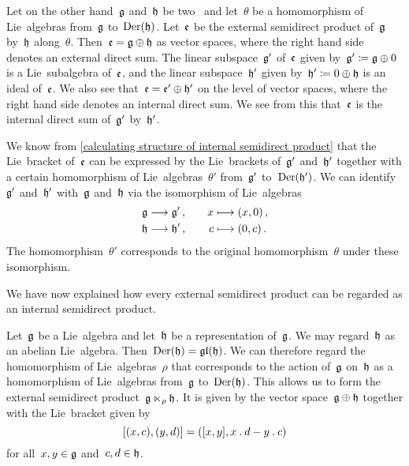 \begin{fluff}
	Let on the other hand~$\mathfrak{g}$ and~$\mathfrak{h}$ be two~\liealgebras{$\kf$} and let~$\theta$ be a homomorphism of Lie~algebras from~$\mathfrak{g}$ to~$\operatorname{Der}(\mathfrak{h})$.
	Let~$\mathfrak{e}$ be the external semidirect product of~$\mathfrak{g}$ by~$\mathfrak{h}$ along~$\theta$.
	Then~$\mathfrak{e} = \mathfrak{g} \oplus \mathfrak{h}$ as vector spaces, where the right hand side denotes an external direct sum.
	The linear subspace~$\mathfrak{g}'$ of~$\mathfrak{e}$ given by~$\mathfrak{g}' \coloneqq \mathfrak{g} \oplus 0$ is a Lie~subalgebra of~$\mathfrak{e}$, and the linear subspace~$\mathfrak{h}'$ given by~$\mathfrak{h}' \coloneqq 0 \oplus \mathfrak{h}$ is an ideal of~$\mathfrak{e}$.
	We also see that~$\mathfrak{e} = \mathfrak{e}' \oplus \mathfrak{h}'$ on the level of vector spaces, where the right hand side denotes an internal direct sum.
	We see from this that~$\mathfrak{e}$ is the internal direct sum of~$\mathfrak{g}'$ by~$\mathfrak{h}'$.

	We know from \cref{calculating structure of internal semidirect product} that the Lie~bracket of~$\mathfrak{e}$ can be expressed by the Lie~brackets of~$\mathfrak{g}'$ and~$\mathfrak{h}'$ together with a certain homomorphism of Lie~algebras~$\theta'$ from~$\mathfrak{g}'$ to~$\operatorname{Der}(\mathfrak{h}')$.
	We can identify~$\mathfrak{g}'$ and~$\mathfrak{h}'$ with~$\mathfrak{g}$ and~$\mathfrak{h}$ via the isomorphism of Lie~algebras
	\begin{alignat*}{2}
		\glie
		&\to
		\glie' \,,
		&\quad
		x
		&\mapsto
		(x, 0) \,,
		\\
		\hlie
		&\to
		\hlie' \,,
		&\quad
		c
		&\mapsto
		(0, c) \,.
	\end{alignat*}
	The homomorphism~$\theta'$ corresponds to the original homomorphism~$\theta$ under these isomorphism.

	We have now explained how every external semidirect product can be regarded as an internal semidirect product.
\end{fluff}


\begin{example}
	Let~$\mathfrak{g}$ be a Lie~algebra and let~$\mathfrak{h}$ be a representation of~$\mathfrak{g}$.
	We may regard~$\mathfrak{h}$ as an abelian Lie~algebra.
	Then~$\operatorname{Der}(\mathfrak{h}) = \mathfrak{gl}(\mathfrak{h})$.
	We can therefore regard the homomorphism of Lie~algebras~$\rho$ that corresponds to the action of~$\mathfrak{g}$ on~$\mathfrak{h}$ as a homomorphism of Lie~algebras from~$\mathfrak{g}$ to~$\operatorname{Der}(\mathfrak{h})$.
	This allows us to form the external semidirect product~$\mathfrak{g} \ltimes_\rho \mathfrak{h}$.
	It is given by the vector space~$\mathfrak{g} \oplus \mathfrak{h}$ together with the Lie~bracket given by
	\[
		[ (x, c), (y, d) ]
		=
		( [x,y], x \mathbin{.} d - y \mathbin{.} c )
	\]
	for all~$x, y \in \mathfrak{g}$ and~$c, d \in \mathfrak{h}$.
\end{example}


